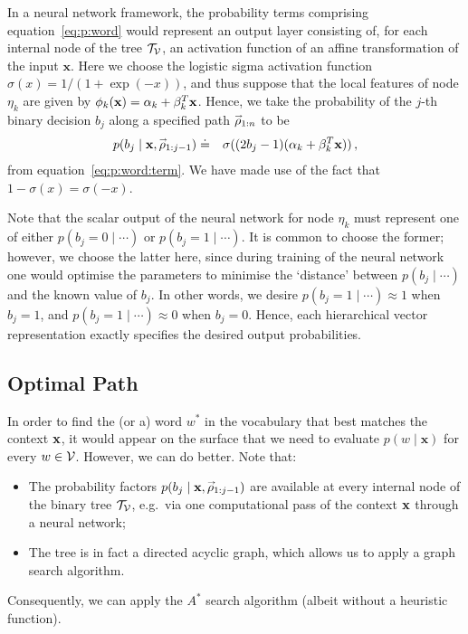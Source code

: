 \documentclass[a4paper]{article}
\newcommand{\rvec}[1]{\accentset{\rightarrow}{#1}}
\begin{document}
In a neural network framework, the probability terms comprising equation~\eqref{eq:p:word} would represent an output layer
consisting of, for each internal node of the tree ${\cal T}_{\cal V}$, an activation function of an affine transformation of the input $\textbf{x}$.
Here we choose the logistic sigma activation function $\sigma(x)=1/(1+\exp{(-x)})$, and thus suppose that the local features of node $\eta_k$
are given by ${\bf\phi}_k({\bf x})=\alpha_k + {\bf \beta}_k^{T}{\bf x}$.
Hence, we take the probability of the $j$-th binary decision $b_j$ along a specified path $\rvec{\rho}_{1:n}$ to be
\begin{eqnarray}
p(b_j\;|\;{\bf x},\rvec{\rho}_{1:j-1}) & \doteq & \sigma((2b_j-1)(\alpha_k+{\bf \beta}_k^{T}{\bf x}))\,,
\end{eqnarray}
from equation~\eqref{eq:p:word:term}. We have made use of the fact that $1-\sigma(x)=\sigma(-x)$.

Note that the scalar output of the neural network for node $\eta_k$ must represent one of either $p(b_j=0\;|\;\cdots)$ or
$p(b_j=1\;|\;\cdots)$. It is common to choose the former; however, we choose the latter here, since during training of the neural network
one would optimise the parameters to minimise the `distance' between $p(b_j\;|\;\cdots)$ and the known value of $b_j$.
In other words, we desire $p(b_j=1\;|\;\cdots)\approx 1$ when $b_j=1$, and $p(b_j=1\;|\;\cdots)\approx 0$ when $b_j=0$.
Hence, each hierarchical vector representation exactly specifies the desired output probabilities.

\subsection{Optimal Path}

In order to find the (or a) word $w^*$ in the vocabulary that best matches the context ${\bf x}$, it would appear on the surface
that we need to evaluate $p(w\;|\;\textbf{x})$ for every $w\in{\cal V}$. However, we can do better. Note that:
\begin{itemize}
\item The probability factors $p(b_j\;|\;\textbf{x},\rvec{\rho}_{1:j-1})$ are available at every internal node of the binary tree ${\cal T}_{\cal V}$,
e.g.\ via one computational pass of the context ${\bf x}$ through a neural network;

\item The tree is in fact a directed acyclic graph, which allows us to apply a graph search algorithm.
\end{itemize}
Consequently, we can apply the $A^*$ search algorithm (albeit without a heuristic function).
\end{document}
